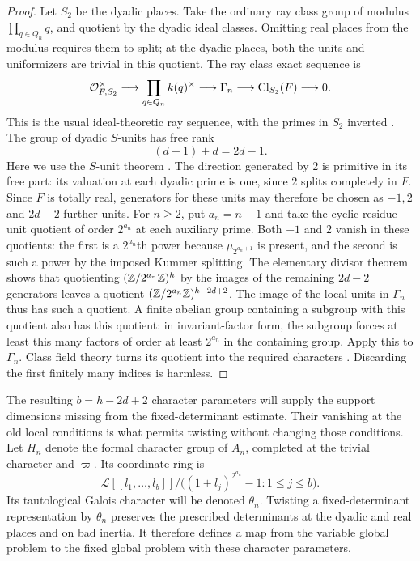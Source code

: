 \begin{proof}
Let $S_2$ be the dyadic places.  Take the ordinary ray class group
of modulus $\prod_{q\in Q_n}q$, and quotient by the dyadic ideal
classes.  Omitting real places from the modulus requires them to
split; at the dyadic places, both the units and uniformizers are
trivial in this quotient.  The ray class exact sequence is
\[
 \mathcal O_{F,S_2}^{\times}\longrightarrow
 \prod_{q\in Q_n}k(q)^\times\longrightarrow
 \Gamma_n\longrightarrow\operatorname{Cl}_{S_2}(F)
 \longrightarrow0 .
\]
This is the usual ideal-theoretic ray sequence, with the primes
in $S_2$ inverted \cite[V, Theorem~1.7]{MilneCFT}.
The group of dyadic $S$-units has free rank
\[
 (d-1)+d=2d-1.
\]
Here we use the $S$-unit theorem
\cite[Theorem~5.11]{MilneANT}.
The direction generated by $2$ is primitive in its free part: its
valuation at each dyadic prime is one, since $2$ splits completely
in $F$.  Since $F$ is totally real, generators for these units may
therefore be chosen as $-1,2$ and $2d-2$ further units.
For $n\geq2$, put $a_n=n-1$ and take the cyclic residue-unit
quotient of order $2^{a_n}$ at each auxiliary prime.
Both $-1$ and $2$ vanish in these quotients: the first is a
$2^{a_n}$th power because $\mu_{2^{a_n+1}}$ is present, and the
second is such a power by the imposed Kummer splitting.
The elementary divisor theorem shows that quotienting
$(\mathbb Z/2^{a_n}\mathbb Z)^h$ by the images of the remaining $2d-2$
generators leaves a quotient
$(\mathbb Z/2^{a_n}\mathbb Z)^{h-2d+2}$.
The image of the local units in $\Gamma_n$ thus has such a
quotient.  A finite abelian group containing a subgroup with
this quotient also has this quotient: in invariant-factor form,
the subgroup forces at least this many factors of order at least
$2^{a_n}$ in the containing group.  Apply this to $\Gamma_n$.
Class field theory turns its quotient into the required
characters \cite[V, Theorems~5.3 and~5.5]{MilneCFT}.
Discarding the first finitely many indices is harmless.
\end{proof}

The resulting \(b=h-2d+2\) character parameters will supply the
support dimensions missing from the fixed-determinant estimate.
Their vanishing at the old local conditions is what permits twisting
without changing those conditions. Let $H_n$ denote the formal
character group of $A_n$, completed at
the trivial character and $\varpi$.  Its coordinate ring is
\[
 \mathcal L[[l_1,\ldots,l_b]]/
 \bigl((1+l_j)^{2^{a_n}}-1:1\leq j\leq b\bigr).
\]
Its tautological Galois character will be denoted $\theta_n$.
Twisting a fixed-determinant representation by $\theta_n$ preserves
the prescribed determinants at the dyadic and real places and on
bad inertia.  It therefore defines a map from the variable global
problem to the fixed global problem with these character parameters.

